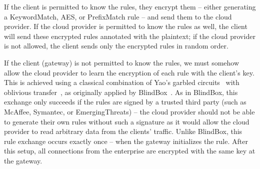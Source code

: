 If the client is permitted to know the rules, they encrypt them -- either generating a KeywordMatch, AES, or PrefixMatch rule -- and send them to the cloud provider. If the cloud provider is permitted to know the rules as well, the client will send these encrypted rules annotated with the plaintext; if the cloud provider is not allowed, the client sends only the encrypted rules in random order.

If the client (gateway) is not permitted to know the rules, we must somehow allow the cloud provider to learn the encryption of each rule with the client's key. This is achieved using a classical combination of Yao's garbled circuits~\cite{Yao86} with oblivious transfer~\cite{Naor-Pinkas}, as originally applied by BlindBox~\cite{blindbox}.
As in BlindBox, this exchange only succeeds if the rules are signed by a trusted third party (such as McAffee, Symantec, or EmergingThreats) -- the cloud provider should not be able to generate their own rules without such a signature as it would allow the cloud provider to read arbitrary data from the clients' traffic.
Unlike BlindBox, this rule exchange occurs exactly once -- when the gateway initializes the rule. 
After this setup, all connections from the enterprise are encrypted with the same key at the gateway.

